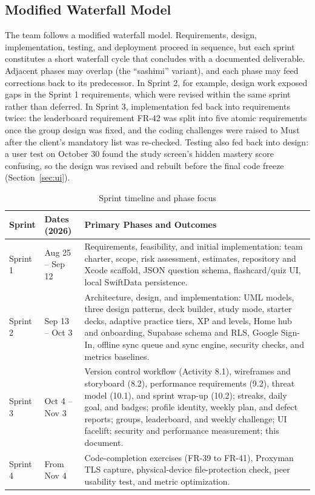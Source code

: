 \documentclass[12pt,letterpaper]{article}
\begin{document}
\subsection{Modified Waterfall Model}
The team follows a modified waterfall model. Requirements, design, implementation,
testing, and deployment proceed in sequence, but each sprint constitutes a short
waterfall cycle that concludes with a documented deliverable. Adjacent phases may
overlap (the ``sashimi'' variant), and each phase may feed corrections back to its
predecessor. In Sprint 2, for example, design work exposed gaps in the Sprint 1
requirements, which were revised within the same sprint rather than deferred. In
Sprint 3, implementation fed back into requirements twice: the leaderboard requirement
FR-42 was split into five atomic requirements once the group design was fixed, and the
coding challenges were raised to Must after the client's mandatory list was
re-checked. Testing also fed back into design: a user test on October 30 found the
study screen's hidden mastery score confusing, so the design was revised and rebuilt
before the final code freeze (Section~\ref{sec:ui}).

\begin{table}[H]
\centering
\caption{Sprint timeline and phase focus}
\label{tab:timeline}
\begin{tabularx}{\textwidth}{@{}l L{3.6cm} Y@{}}
\toprule
\textbf{Sprint} & \textbf{Dates (2026)} & \textbf{Primary Phases and Outcomes} \\
\midrule
Sprint 1 & Aug 25 -- Sep 12 & Requirements, feasibility, and initial implementation: team charter, scope, risk assessment, estimates, repository and Xcode scaffold, JSON question schema, flashcard/quiz UI, local SwiftData persistence. \\
Sprint 2 & Sep 13 -- Oct 3 & Architecture, design, and implementation: UML models, three design patterns, deck builder, study mode, starter decks, adaptive practice tiers, XP and levels, Home hub and onboarding, Supabase schema and RLS, Google Sign-In, offline sync queue and sync engine, security checks, and metrics baselines. \\
Sprint 3 & Oct 4 -- Nov 3 & Version control workflow (Activity 8.1), wireframes and storyboard (8.2), performance requirements (9.2), threat model (10.1), and sprint wrap-up (10.2); streaks, daily goal, and badges; profile identity, weekly plan, and defect reports; groups, leaderboard, and weekly challenge; UI facelift; security and performance measurement; this document. \\
Sprint 4 & From Nov 4 & Code-completion exercises (FR-39 to FR-41), Proxyman TLS capture, physical-device file-protection check, peer usability test, and metric optimization. \\
\bottomrule
\end{tabularx}
\end{table}
\end{document}
